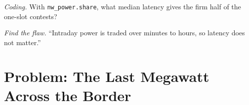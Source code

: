 \begin{exercise}[$\star\star\star$]\label{exo:nw:power-commodities-and-betting-connectivity:7}
\emph{Coding.} With \texttt{nw\_power.share}, what median latency gives the firm half of the one-slot contests?
\end{exercise}

\begin{exercise}[$\star\star\star$]\label{exo:nw:power-commodities-and-betting-connectivity:8}
\emph{Find the flaw.} ``Intraday power is traded over minutes to hours, so latency does not matter.''
\end{exercise}

\section{Problem: The Last Megawatt Across the Border}

